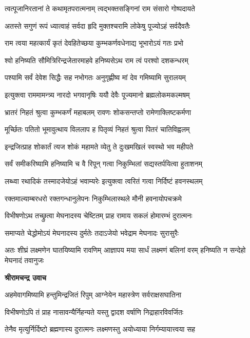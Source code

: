 \twolineshloka
{त्वत्पूजानिरतानां ते कथामृतपरात्मनाम्}
{त्वद्भक्तसङ्गिनां राम संसारो गोष्पदायते} %

\twolineshloka
{अतस्ते सगुणं रूपं ध्यात्वाहं सर्वदा हृदि}
{मुक्तश्चरामि लोकेषु पूज्योऽहं सर्वदैवतैः} %

\twolineshloka
{राम त्वया महत्कार्यं कृतं देवहितेच्छया}
{कुम्भकर्णवधेनाद्य भूभारोऽयं गतः प्रभो} %

\twolineshloka
{श्वो हनिष्यति सौमित्रिरिन्द्रजेतारमाहवे}
{हनिष्यसेऽथ राम त्वं परश्वो दशकन्धरम्} %

\twolineshloka
{पश्यामि सर्वं देवेश सिद्धैः सह नभोगतः}
{अनुगृह्णीष्व मां देव गमिष्यामि सुरालयम्} %

\twolineshloka
{इत्युक्त्वा राममामन्त्र्य नारदो भगवानृषिः}
{ययौ देवैः पूज्यमानो ब्रह्मलोकमकल्मषम्} %

\twolineshloka
{भ्रातरं निहतं श्रुत्वा कुम्भकर्णं महाबलम्}
{रावणः शोकसन्तप्तो रामेणाक्लिष्टकर्मणा} %

\twolineshloka
{मूर्च्छितः पतितो भूमावुत्थाय विललाप ह}
{पितृव्यं निहतं श्रुत्वा पितरं चातिविह्वलम्} %

\twolineshloka
{इन्द्रजित्प्राह शोकार्तं त्यज शोकं महामते}
{व्येतु ते दुःखमखिलं स्वस्थो भव महीपते} %

\twolineshloka
{सर्वं समीकरिष्यामि हनिष्यामि च वै रिपून्}
{गत्वा निकुम्भिलां सद्यस्तर्पयित्वा हुताशनम्} %

\twolineshloka
{लब्ध्वा रथादिकं तस्मादजेयोऽहं भवाम्यरेः}
{इत्युक्त्वा त्वरितं गत्वा निर्दिष्टं हवनस्थलम्} %

\twolineshloka
{रक्तमाल्याम्बरधरो रक्तगन्धानुलेपनः}
{निकुम्भिलास्थले मौनी हवनायोपचक्रमे} %

\twolineshloka
{विभीषणोऽथ तच्छ्रुत्वा मेघनादस्य चेष्टितम्}
{प्राह रामाय सकलं होमारम्भं दुरात्मनः} %

\twolineshloka
{समाप्यते चेद्धोमोऽयं मेघनादस्य दुर्मतेः}
{तदाऽजेयो भवेद्राम मेघनादः सुरासुरैः} %

\threelineshloka
{अतः शीघ्रं लक्ष्मणेन घातयिष्यामि रावणिम्}
{आज्ञापय मया सार्धं लक्ष्मणं बलिनां वरम्}
{हनिष्यति न सन्देहो मेघनादं तवानुजः} %

\textbf{श्रीरामचन्द्र उवाच}

\twolineshloka
{अहमेवागमिष्यामि हन्तुमिन्द्रजितं रिपुम्}
{आग्नेयेन महास्त्रेण सर्वराक्षसघातिना} %

\twolineshloka
{विभीषणोऽपि तं प्राह नासावन्यैर्निहन्यते}
{यस्तु द्वादश वर्षाणि निद्राहारविवर्जितः} %

\twolineshloka
{तेनैव मृत्युर्निर्दिष्टो ब्रह्मणास्य दुरात्मनः}
{लक्ष्मणस्तु अयोध्याया निर्गम्यायात्त्वया सह} %

